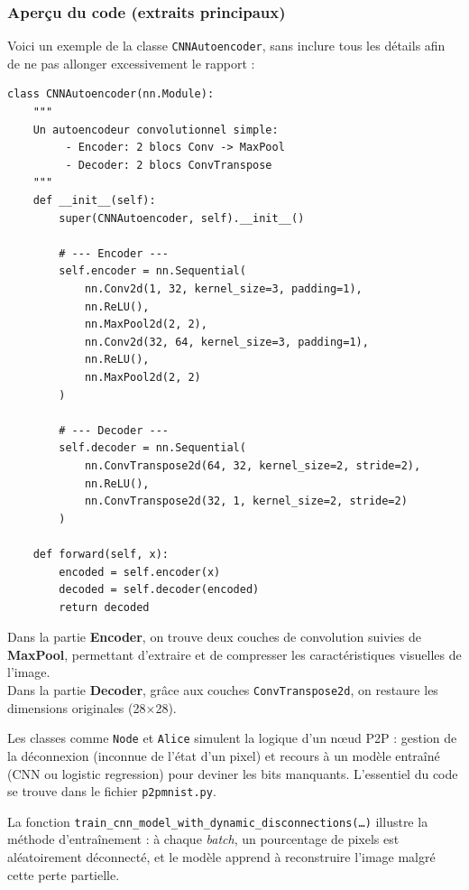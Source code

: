 \documentclass[a4paper,12pt]{article}
\begin{document}
\subsubsection{Aperçu du code (extraits principaux)}
Voici un exemple de la classe \texttt{CNNAutoencoder}, sans inclure tous les d\'etails afin de ne pas allonger excessivement le rapport :

\begin{verbatim}
class CNNAutoencoder(nn.Module):
    """
    Un autoencodeur convolutionnel simple:
         - Encoder: 2 blocs Conv -> MaxPool
         - Decoder: 2 blocs ConvTranspose
    """
    def __init__(self):
        super(CNNAutoencoder, self).__init__()
        
        # --- Encoder ---
        self.encoder = nn.Sequential(
            nn.Conv2d(1, 32, kernel_size=3, padding=1),
            nn.ReLU(),
            nn.MaxPool2d(2, 2),
            nn.Conv2d(32, 64, kernel_size=3, padding=1),
            nn.ReLU(),
            nn.MaxPool2d(2, 2)
        )
        
        # --- Decoder ---
        self.decoder = nn.Sequential(
            nn.ConvTranspose2d(64, 32, kernel_size=2, stride=2),
            nn.ReLU(),
            nn.ConvTranspose2d(32, 1, kernel_size=2, stride=2)
        )
        
    def forward(self, x):
        encoded = self.encoder(x)
        decoded = self.decoder(encoded)
        return decoded
\end{verbatim}

\noindent
Dans la partie \textbf{Encoder}, on trouve deux couches de convolution suivies de \textbf{MaxPool}, permettant d'extraire et de compresser les caract\'eristiques visuelles de l'image.\\
Dans la partie \textbf{Decoder}, grâce aux couches \texttt{ConvTranspose2d}, on restaure les dimensions originales (28$\times$28).

Les classes comme \texttt{Node} et \texttt{Alice} simulent la logique d'un n\oe ud P2P : gestion de la d\'econnexion (inconnue de l'\'etat d'un pixel) et recours \`a un mod\`ele entra\^in\'e (CNN ou logistic regression) pour deviner les bits manquants. L'essentiel du code se trouve dans le fichier \texttt{p2pmnist.py}.  

La fonction \texttt{train\_cnn\_model\_with\_dynamic\_disconnections(\dots)} illustre la m\'ethode d'entra\^inement : \`a chaque \emph{batch}, un pourcentage de pixels est al\'eatoirement d\'econnect\'e, et le mod\`ele apprend \`a reconstruire l'image malgr\'e cette perte partielle.
\end{document}
